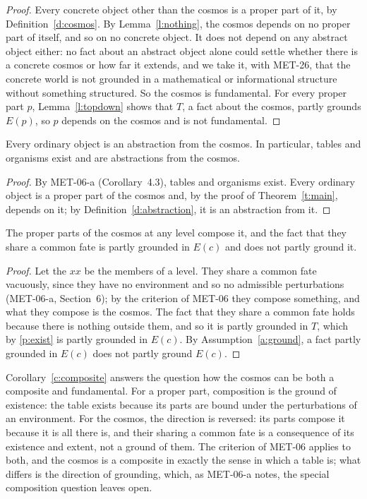 \documentclass{situationist-preprint}
\begin{document}
\begin{proof}
Every concrete object other than the cosmos is a proper part of it, by Definition~\ref{d:cosmos}. By Lemma~\ref{l:nothing}, the cosmos depends on no proper part of itself, and so on no concrete object. It does not depend on any abstract object either: no fact about an abstract object alone could settle whether there is a concrete cosmos or how far it extends, and we take it, with MET-26, that the concrete world is not grounded in a mathematical or informational structure without something structured. So the cosmos is fundamental. For every proper part $p$, Lemma~\ref{l:topdown} shows that $T$, a fact about the cosmos, partly grounds $E(p)$, so $p$ depends on the cosmos and is not fundamental.
\end{proof}

\begin{corollary}[Abstraction]\label{c:abstraction}
Every ordinary object is an abstraction from the cosmos. In particular, tables and organisms exist and are abstractions from the cosmos.
\end{corollary}

\begin{proof}
By MET-06-a (Corollary~4.3), tables and organisms exist. Every ordinary object is a proper part of the cosmos and, by the proof of Theorem~\ref{t:main}, depends on it; by Definition~\ref{d:abstraction}, it is an abstraction from it.
\end{proof}

\begin{corollary}\label{c:composite}
The proper parts of the cosmos at any level compose it, and the fact that they share a common fate is partly grounded in $E(c)$ and does not partly ground it.
\end{corollary}

\begin{proof}
Let the $xx$ be the members of a level. They share a common fate vacuously, since they have no environment and so no admissible perturbations (MET-06-a, Section~6); by the criterion of MET-06 they compose something, and what they compose is the cosmos. The fact that they share a common fate holds because there is nothing outside them, and so it is partly grounded in $T$, which by \ref{p:exist} is partly grounded in $E(c)$. By Assumption~\ref{a:ground}, a fact partly grounded in $E(c)$ does not partly ground $E(c)$.
\end{proof}

Corollary~\ref{c:composite} answers the question how the cosmos can be both a composite and fundamental. For a proper part, composition is the ground of existence: the table exists because its parts are bound under the perturbations of an environment. For the cosmos, the direction is reversed: its parts compose it because it is all there is, and their sharing a common fate is a consequence of its existence and extent, not a ground of them. The criterion of MET-06 applies to both, and the cosmos is a composite in exactly the sense in which a table is; what differs is the direction of grounding, which, as MET-06-a notes, the special composition question leaves open.
\end{document}

